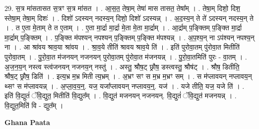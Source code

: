 \documentclass[17pt]{extarticle}
\begin{document}
29. स॒त्र मा॑सतासत स॒त्रꣳ स॒त्र मा॑सत । . आ॒स॒त॒ तेषा॒म् तेषा॑ मास तासत॒ तेषा᳚म् । . तेषा॒म् दिशो॒ दिश॒ स्तेषा॒म् तेषा॒म् दिशः॑ । . दिशो॑ ऽदस्यन् नदस्य॒न् दिशो॒ दिशो॑ ऽदस्यन्न् । . अ॒द॒स्य॒न् ते ते॑ ऽदस्यन् नदस्य॒न् ते । . त ए॒ता मे॒ताम् ते त ए॒ताम् । . ए॒ता मा॒र्द्रा मा॒र्द्रा मे॒ता मे॒ता मा॒र्द्राम् । . आ॒र्द्राम् प॒ङ्क्तिम् प॒ङ्क्ति मा॒र्द्रा मा॒र्द्राम् प॒ङ्क्तिम् । . प॒ङ्क्ति म॑पश्यन् नपश्यन् प॒ङ्क्तिम् प॒ङ्क्ति म॑पश्यन्न् । . अ॒प॒श्य॒न् ना ऽप॑श्यन् नपश्य॒न् ना । . आ श्रा॑वय श्राव॒या श्रा॑वय । . श्रा॒व॒ये तीति॑ श्रावय श्राव॒ये ति॑ । . इति॑ पुरोवा॒तम् पु॑रोवा॒त मितीति॑ पुरोवा॒तम् । . पु॒रो॒वा॒त म॑जनयन् नजनयन् पुरोवा॒तम् पु॑रोवा॒त म॑जनयन्न् । . पु॒रो॒वा॒तमिति॑ पुरः - वा॒तम् । . अ॒ज॒न॒य॒न् नस्त्व स्त्व॑जनयन् नजनय॒न् नस्तु॑ । . अस्तु॒ श्रौष॒ट् छ्रौष॒ डस्त्वस्तु॒ श्रौष॑ट् । . श्रौष॒ डितीति॒ श्रौष॒ट् छ्रौष॒ डिति॑ । . इत्य॒भ्र म॒भ्र मिती त्य॒भ्रम् । . अ॒भ्रꣳ सꣳ स म॒भ्र म॒भ्रꣳ सम् । . स म॑प्लावयन् नप्लावय॒न् थ्सꣳ स म॑प्लावयन्न् । . अ॒प्ला॒व॒य॒न्॒. यज॒ यजा᳚प्लावयन् नप्लावय॒न्॒. यज॑ । . यजे तीति॒ यज॒ यजे ति॑ । . इति॑ वि॒द्युतं॑ ॅवि॒द्युत॒ मितीति॑ वि॒द्युत᳚म् । . वि॒द्युत॑ मजनयन् नजनयन्. वि॒द्युतं॑ ॅवि॒द्युत॑ मजनयन्न् । . वि॒द्युत॒मिति॑ वि - द्युत᳚म् । \newline

\textbf{Ghana Paata } \newline
\end{document}
